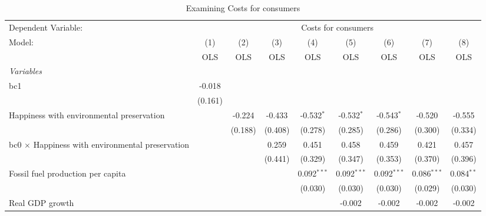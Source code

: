 
\begin{table}[htbp]
   \caption{Examining Costs for consumers}
   \centering
   \begin{tabular}{lcccccccc}
      \toprule
      Dependent Variable: & \multicolumn{8}{c}{Costs for consumers}\\
      Model:                                                  & (1)     & (2)     & (3)     & (4)           & (5)           & (6)           & (7)           & (8)\\  
                                                              &  OLS    & OLS     & OLS     & OLS           & OLS           & OLS           & OLS           & OLS\\  
      \midrule
      \emph{Variables}\\
      bc1                                                     & -0.018  &         &         &               &               &               &               &   \\   
                                                              & (0.161) &         &         &               &               &               &               &   \\   
      Happiness with environmental preservation               &         & -0.224  & -0.433  & -0.532$^{*}$  & -0.532$^{*}$  & -0.543$^{*}$  & -0.520        & -0.555\\   
                                                              &         & (0.188) & (0.408) & (0.278)       & (0.285)       & (0.286)       & (0.300)       & (0.334)\\   
      bc0 $\times$ Happiness with environmental preservation  &         &         & 0.259   & 0.451         & 0.458         & 0.459         & 0.421         & 0.457\\   
                                                              &         &         & (0.441) & (0.329)       & (0.347)       & (0.353)       & (0.370)       & (0.396)\\   
      Fossil fuel production per capita                       &         &         &         & 0.092$^{***}$ & 0.092$^{***}$ & 0.092$^{***}$ & 0.086$^{***}$ & 0.084$^{**}$\\   
                                                              &         &         &         & (0.030)       & (0.030)       & (0.030)       & (0.029)       & (0.030)\\   
      Real GDP growth                                         &         &         &         &               & -0.002        & -0.002        & -0.002        & -0.002\\   

\end{tabular}
\end{table}
